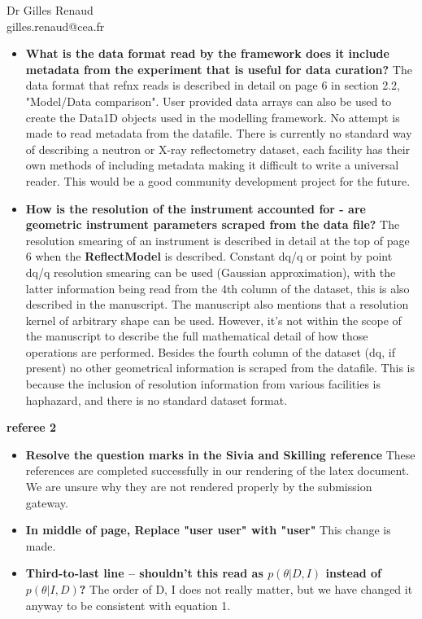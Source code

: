 \documentclass[fontsize=12pt, paper=a4]{scrlttr2}
\begin{document}
\begin{letter}{Dr Gilles Renaud \\ gilles.renaud@cea.fr}
\begin{itemize}
\item \textbf{What is the data format read by the framework does it include metadata from the experiment that is useful for data curation?} The data format that refnx reads is described in detail on page 6 in section 2.2, "Model/Data comparison". User provided data arrays can also be used to create the Data1D objects used in the modelling framework. No attempt is made to read metadata from the datafile. There is currently no standard way of describing a neutron or X-ray reflectometry dataset, each facility has their own methods of including metadata making it difficult to write a universal reader. This would be a good community development project for the future.
\item \textbf{How is the resolution of the instrument accounted for - are geometric instrument parameters scraped from the data file?} The resolution smearing of an instrument is described in detail at the top of page 6 when the \textbf{ReflectModel} is described. Constant dq/q or point by point dq/q resolution smearing can be used (Gaussian approximation), with the latter information being read from the 4th column of the dataset, this is also described in the manuscript. The manuscript also mentions that a resolution kernel of arbitrary shape can be used. However, it's not within the scope of the manuscript to describe the full mathematical detail of how those operations are performed. Besides the fourth column of the dataset (dq, if present) no other geometrical information is scraped from the datafile. This is because the inclusion of resolution information from various facilities is haphazard, and there is no standard dataset format.

\end{itemize}


\textbf{referee 2}
\begin{itemize}
\item \textbf{Resolve the question marks in the Sivia and Skilling reference} These references are completed successfully in our rendering of the latex document. We are unsure why they are not rendered properly by the submission gateway.
\item \textbf{In middle of page, Replace "user user" with "user"} This change is made.
\item \textbf{Third-to-last line – shouldn't this read as $p(\theta|D,I)$ instead of $p(\theta|I,D)$?} The order of D, I does not really matter, but we have changed it anyway to be consistent with equation 1.
\end{itemize}



\end{letter}
\end{document}
